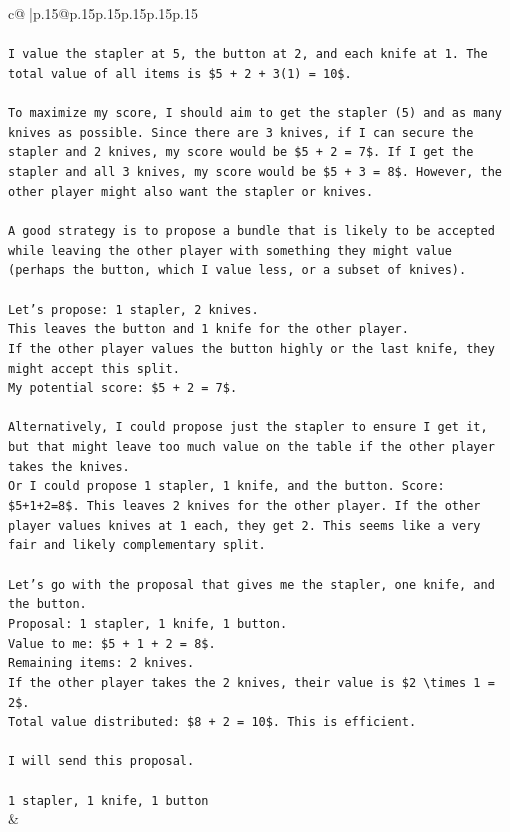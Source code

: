 \documentclass{article}
\begin{document}
{\begin{supertabular}{c@{$\;$}|p{.15\linewidth}@{}p{.15\linewidth}p{.15\linewidth}p{.15\linewidth}p{.15\linewidth}p{.15\linewidth}}
{{{\\ 
\\ 
\texttt{I value the stapler at 5, the button at 2, and each knife at 1. The total value of all items is \$5 + 2 + 3(1) = 10\$.} \\
\\ 
\texttt{To maximize my score, I should aim to get the stapler (5) and as many knives as possible. Since there are 3 knives, if I can secure the stapler and 2 knives, my score would be \$5 + 2 = 7\$. If I get the stapler and all 3 knives, my score would be \$5 + 3 = 8\$. However, the other player might also want the stapler or knives.} \\
\\ 
\texttt{A good strategy is to propose a bundle that is likely to be accepted while leaving the other player with something they might value (perhaps the button, which I value less, or a subset of knives).} \\
\\ 
\texttt{Let's propose: 1 stapler, 2 knives.} \\
\texttt{This leaves the button and 1 knife for the other player.} \\
\texttt{If the other player values the button highly or the last knife, they might accept this split.} \\
\texttt{My potential score: \$5 + 2 = 7\$.} \\
\\ 
\texttt{Alternatively, I could propose just the stapler to ensure I get it, but that might leave too much value on the table if the other player takes the knives.} \\
\texttt{Or I could propose 1 stapler, 1 knife, and the button. Score: \$5+1+2=8\$. This leaves 2 knives for the other player. If the other player values knives at 1 each, they get 2. This seems like a very fair and likely complementary split.} \\
\\ 
\texttt{Let's go with the proposal that gives me the stapler, one knife, and the button.} \\
\texttt{Proposal: 1 stapler, 1 knife, 1 button.} \\
\texttt{Value to me: \$5 + 1 + 2 = 8\$.} \\
\texttt{Remaining items: 2 knives.} \\
\texttt{If the other player takes the 2 knives, their value is \$2 \textbackslash{}times 1 = 2\$.} \\
\texttt{Total value distributed: \$8 + 2 = 10\$. This is efficient.} \\
\\ 
\texttt{I will send this proposal.} \\
\\ 
\texttt{1 stapler, 1 knife, 1 button} \\
            }
        }
    }
    & \\ \\


\end{supertabular}}
\end{document}
